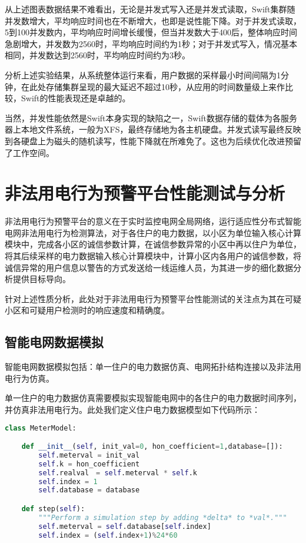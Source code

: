 从上述图表数据结果不难看出，无论是并发式写入还是并发式读取，Swift集群随并发数增大，平均响应时间也在不断增大，也即是说性能下降。对于并发式读取，5到100并发数内，平均响应时间增长缓慢，但当并发数大于400后，整体响应时间急剧增大，并发数为2560时，平均响应时间约为1秒；对于并发式写入，情况基本相同，并发数达到2560时，平均响应时间约为3秒。

分析上述实验结果，从系统整体运行来看，用户数据的采样最小时间间隔为1分钟，在此处存储集群呈现的最大延迟不超过10秒，从应用的时间数量级上来作比较，Swift的性能表现还是卓越的。

当然，并发性能依然是Swift本身实现的缺陷之一，Swift数据存储的载体为各服务器上本地文件系统，一般为XFS，最终存储地为各主机硬盘。并发式读写最终反映到各硬盘上为磁头的随机读写，性能下降就在所难免了。这也为后续优化改进预留了工作空间。

\section{非法用电行为预警平台性能测试与分析}

非法用电行为预警平台的意义在于实时监控电网全局网络，运行适应性分布式智能电网非法用电行为检测算法，对于各住户的电力数据，以小区为单位输入核心计算模块中，完成各小区的诚信参数计算，在诚信参数异常的小区中再以住户为单位，将其后续采样的电力数据输入核心计算模块中，计算小区内各用户的诚信参数，将诚信异常的用户信息以警告的方式发送给一线运维人员，为其进一步的细化数据分析提供目标导向。

针对上述性质分析，此处对于非法用电行为预警平台性能测试的关注点为其在可疑小区和可疑用户检测时的响应速度和精确度。

\subsection{智能电网数据模拟}

智能电网数据模拟包括：单一住户的电力数据仿真、电网拓扑结构连接以及非法用电行为仿真。

单一住户的电力数据仿真需要模拟实现智能电网中的各住户的电力数据时间序列，并仿真非法用电行为。此处我们定义住户电力数据模型如下代码所示：

\begin{lstlisting}[language={Python}, caption={住户电力数据模型Mosaik实现}]
class MeterModel:

    def __init__(self, init_val=0, hon_coefficient=1,database=[]):
        self.meterval = init_val
        self.k = hon_coefficient
        self.realval　= self.meterval * self.k
        self.index = 1
        self.database = database

    def step(self):
        """Perform a simulation step by adding *delta* to *val*."""
        self.meterval = self.database[self.index]
        self.index = (self.index+1)%24*60

\end{lstlisting}

